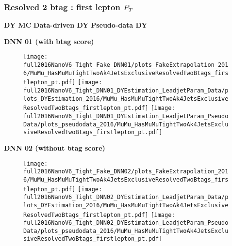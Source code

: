 \documentclass[9pt]{beamer}
\begin{document}
\begin{frame}
	\frametitle{Resolved 2 btag : first lepton $P_T$}
    \hspace{2cm} \textbf{DY MC} \hspace{1.9cm} \textbf{Data-driven DY} \hspace{1cm} \textbf{Pseudo-data DY}
    \begin{center}
        \textbf{DNN 01 (with btag score)}
    \end{center}
	\begin{figure}
		\texttt{[image: full2016NanoV6\_Tight\_Fake\_DNN01/plots\_FakeExtrapolation\_2016/MuMu\_HasMuMuTightTwoAk4JetsExclusiveResolvedTwoBtags\_firstlepton\_pt.pdf]}
		\texttt{[image: full2016NanoV6\_Tight\_DNN01\_DYEstimation\_LeadjetParam\_Data/plots\_DYEstimation\_2016/MuMu\_HasMuMuTightTwoAk4JetsExclusiveResolvedTwoBtags\_firstlepton\_pt.pdf]}
		\texttt{[image: full2016NanoV6\_Tight\_DNN01\_DYEstimation\_LeadjetParam\_PseudoData/plots\_pseudodata\_2016/MuMu\_HasMuMuTightTwoAk4JetsExclusiveResolvedTwoBtags\_firstlepton\_pt.pdf]}
	\end{figure}
    \begin{center}
        \textbf{DNN 02 (without btag score)}
    \end{center}
	\begin{figure}
		\texttt{[image: full2016NanoV6\_Tight\_Fake\_DNN02/plots\_FakeExtrapolation\_2016/MuMu\_HasMuMuTightTwoAk4JetsExclusiveResolvedTwoBtags\_firstlepton\_pt.pdf]}
		\texttt{[image: full2016NanoV6\_Tight\_DNN02\_DYEstimation\_LeadjetParam\_Data/plots\_DYEstimation\_2016/MuMu\_HasMuMuTightTwoAk4JetsExclusiveResolvedTwoBtags\_firstlepton\_pt.pdf]}
		\texttt{[image: full2016NanoV6\_Tight\_DNN02\_DYEstimation\_LeadjetParam\_PseudoData/plots\_pseudodata\_2016/MuMu\_HasMuMuTightTwoAk4JetsExclusiveResolvedTwoBtags\_firstlepton\_pt.pdf]}
	\end{figure}
\end{frame}
\end{document}
